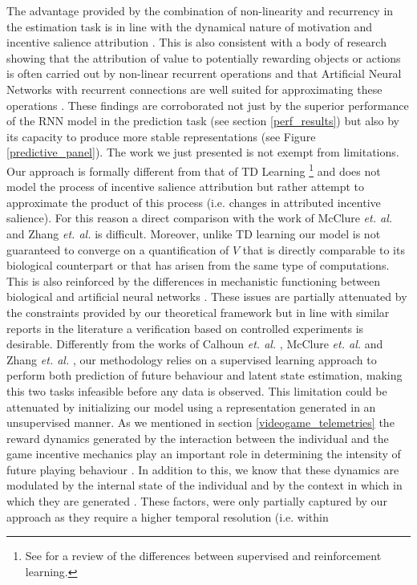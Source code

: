 The advantage provided by the combination of non-linearity and recurrency in the estimation task is in line with the dynamical nature of motivation and incentive salience attribution \cite{toates1994comparing,robinson1993neural,zhang2009neural,tindell2009dynamic,berridge2012prediction}. This is also consistent with a body of research showing that the attribution of value to potentially rewarding objects or actions is often carried out by non-linear recurrent operations \cite{song2017reward,wang2018prefrontal} and that Artificial Neural Networks with recurrent connections are well suited for approximating these operations \cite{kietzmann2018deep}. These findings are corroborated not just by the superior performance of the RNN model in the prediction task (see section \ref{perf_results}) but also by its capacity to produce more stable representations (see Figure \ref{predictive_panel}). The work we just presented is not exempt from limitations. Our approach is formally different from that of TD Learning \footnote{See \cite{barto2004reinforcement} for a  review of the differences between supervised and reinforcement learning.} and does not model the process of incentive salience attribution but rather attempt to approximate the product of this process (i.e. changes in attributed incentive salience). For this reason a direct comparison with the work of McClure \textit{et. al.} \cite{mcclure2003computational} and Zhang \textit{et. al.} \cite{zhang2009neural} is difficult. Moreover, unlike TD learning \cite{schultz1997neural} our model is not guaranteed to converge on a quantification of $V$ that is directly comparable to its biological counterpart or that has arisen from the same type of computations. This is also reinforced by the differences in mechanistic functioning between biological and artificial neural networks \cite{lillicrap2019backpropagation,lillicrap2020backpropagation}. These issues are partially attenuated by the constraints provided by our theoretical framework but in line with similar reports in the literature \cite{calhoun2019unsupervised,wang2018prefrontal} a verification based on controlled experiments is desirable. Differently from the works of Calhoun \textit{et. al.} \cite{calhoun2019unsupervised},  McClure \textit{et. al.} \cite{mcclure2003computational} and Zhang \textit{et. al.} \cite{zhang2009neural}, our methodology relies on a  supervised learning approach to perform both prediction of future behaviour and latent state estimation, making this two tasks infeasible before any data is observed. This limitation could be attenuated by initializing our model using a representation  generated in an unsupervised manner. As we mentioned in section \ref{videogame_telemetries} the reward dynamics generated by the interaction between the individual and the game incentive mechanics play an important role in determining the intensity of future playing behaviour \cite{agarwal2017quitting, avserivskis2017computational, wang2018beyond}. In addition to this, we know that these dynamics are modulated by the internal state of the individual \cite{zhang2009neural} and by the context in which in which they are generated \cite{palminteri2015contextual}. These factors, were only partially captured by our approach as they require a higher temporal resolution (i.e. within 